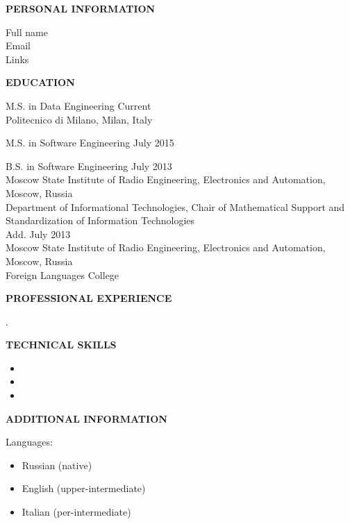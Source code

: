 \documentclass[a4paper,12pt,fullpage]{article}
\begin{document}
\begin{center}
	\textbf{PERSONAL INFORMATION\\}
\end{center}
Full name\\
Email\\
Links\\

\begin{center}
	\textbf{EDUCATION}
\end{center}	

M.S. in Data Engineering \hfill Current\\
Politecnico di Milano, Milan, Italy

M.S. in Software Engineering \hfill July 2015

B.S. in Software Engineering \hfill July 2013\\
Moscow State Institute of Radio Engineering, Electronics and Automation, Moscow, Russia\\
Department of Informational Technologies, Chair of Mathematical Support and Standardization of Information Technologies\\
Add. \hfill July 2013\\
Moscow State Institute of Radio Engineering, Electronics and Automation, Moscow, Russia\\
Foreign Languages College\\

\begin{center}
	\textbf{PROFESSIONAL EXPERIENCE}
\end{center}	
.\\

\begin{center}
	\textbf{TECHNICAL SKILLS}
\end{center}
\begin{itemize}
	\item 
	\item 
	\item 
\end{itemize}

\begin{center}
	\textbf{ADDITIONAL INFORMATION}
\end{center}
Languages: 
\begin{itemize}
	\item Russian (native)
	\item English (upper-intermediate)
	\item Italian (per-intermediate)
\end{itemize}
\end{document}

